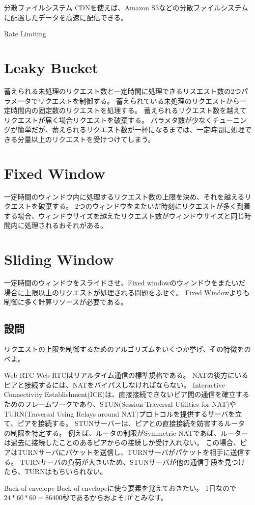 \documentclass[book]{jlreq}
\begin{document}
\begin{chapter-bib}{分散ファイルシステム}
  CDNを使えば、Amazon S3などの分散ファイルシステムに配置したデータを高速に配信できる\cite{lc-databases}。
\end{chapter-bib}
\begin{chapter-bib}{Rate Limiting}
  \section{Leaky Bucket}
  蓄えられる未処理のリクエスト数と一定時間に処理できるリスエスト数の2つパラメータでリクエストを制御する\cite{sdi}。
  蓄えられている未処理のリクエストから一定時間内の固定数のリクエストを処理する。
  蓄えられるリクエスト数を越えてリクエストが届く場合リクエストを破棄する。
  パラメタ数が少なくチューニングが簡単だが、蓄えられるリクエスト数が一杯になるまでは、一定時間に処理できる分量以上のリクエストを受けつけてしまう。
  \section{Fixed Window}
  一定時間のウィンドウ内に処理するリクエスト数の上限を決め、それを越えるリクエストを破棄する。
  2つのウィンドウをまたいだ時刻にリクエストが多く到着する場合、ウィンドウサイズを越えたリクエスト数がウィンドウサイズと同じ時間内に処理されるおそれがある。
  \section{Sliding Window}
  一定時間のウィンドウをスライドさせ、Fixed windowのウィンドウをまたいだ場合に上限以上のリクエストが処理される問題をふせぐ。
  Fixed Windowよりも制御に多く計算リソースが必要である。
  \subsection{設問}
  \begin{exercise}
  \item リクエストの上限を制御するためのアルゴリズムをいくつか挙げ、その特徴をのべよ。
  \end{exercise}
\end{chapter-bib}
\begin{chapter-bib}{Web RTC}
  Web RTCはリアルタイム通信の標準規格である\cite{webrtc}。
  NATの後方にいるピアと接続するには、NATをバイパスしなければならない。
  Interactive Connectivity Establishment(ICE)は、直接接続できないピア間の通信を確立するためのフレームワークであり、STUN(Session Traversal Utilities for NAT)やTURN(Traversal Using Relays around NAT)プロトコルを提供するサーバを立て、ピアを接続する\cite{mdn-webrtc}。
  STUNサーバーは、ピアとの直接接続を妨害するルータの制限を特定する。
  例えば、ルータの制限がSymmetric NATであば、ルーターは過去に接続したことのあるピアからの接続しか受け入れない。
  この場合、ピアはTURNサーバにパケットを送信し、TURNサーバがパケットを相手に送信する。
  TURNサーバの負荷が大きいため、STUNサーバが他の通信手段を見つけたら、TURNはもちいられない。
\end{chapter-bib}
\begin{chapter-bib}{Back of envelope}
  Back of envelopeに使う要素を覚えておきたい。
  1日なので$24*60*60=86400$秒であるからおよそ$10^5$とみなす\cite{sdi2}。
\end{chapter-bib}
\end{document}
